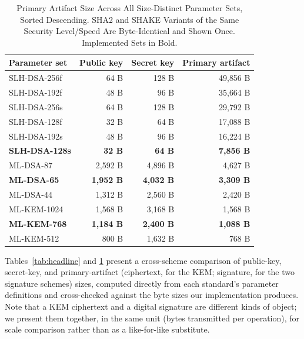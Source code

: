 \documentclass[10pt,conference]{IEEEtran}
\begin{document}
\begin{table}[!t]
\caption{Primary Artifact Size Across All Size-Distinct Parameter Sets,
Sorted Descending. SHA2 and SHAKE Variants of the Same Security
Level/Speed Are Byte-Identical and Shown Once. Implemented Sets in Bold.}
\label{tab:allvariants}
\centering
\begin{tabular}{lrrr}
\toprule
Parameter set & Public key & Secret key & Primary artifact \\
\midrule
SLH-DSA-256f     & 64 B    & 128 B   & 49{,}856 B \\
SLH-DSA-192f     & 48 B    & 96 B    & 35{,}664 B \\
SLH-DSA-256s     & 64 B    & 128 B   & 29{,}792 B \\
SLH-DSA-128f     & 32 B    & 64 B    & 17{,}088 B \\
SLH-DSA-192s     & 48 B    & 96 B    & 16{,}224 B \\
\textbf{SLH-DSA-128s} & \textbf{32 B} & \textbf{64 B} & \textbf{7{,}856 B} \\
ML-DSA-87        & 2{,}592 B & 4{,}896 B & 4{,}627 B \\
\textbf{ML-DSA-65} & \textbf{1{,}952 B} & \textbf{4{,}032 B} & \textbf{3{,}309 B} \\
ML-DSA-44        & 1{,}312 B & 2{,}560 B & 2{,}420 B \\
ML-KEM-1024      & 1{,}568 B & 3{,}168 B & 1{,}568 B \\
\textbf{ML-KEM-768} & \textbf{1{,}184 B} & \textbf{2{,}400 B} & \textbf{1{,}088 B} \\
ML-KEM-512       & 800 B   & 1{,}632 B & 768 B \\
\bottomrule
\end{tabular}
\end{table}

Tables~\ref{tab:headline} and \ref{tab:allvariants} present a
cross-scheme comparison of public-key, secret-key, and primary-artifact
(ciphertext, for the KEM; signature, for the two signature schemes)
sizes, computed directly from each standard's parameter definitions and
cross-checked against the byte sizes our implementation produces. Note
that a KEM ciphertext and a digital signature are different kinds of
object; we present them together, in the same unit (bytes transmitted
per operation), for scale comparison rather than as a like-for-like
substitute.
\end{document}
